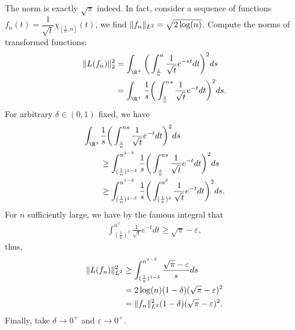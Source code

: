 \begin{enumerate}
\begin{proofc}[Remark]
The norm is exactly $\sqrt{\pi}$ indeed. 
In fact, consider a sequence of functions 
$f_{n}(t)=\dfrac{1}{\sqrt{t}}\chi_{[\frac{1}{n},n]}(t)$, 
we find $\Vert f_{n} \Vert_{L^2}=\sqrt{2 \log(n)}$. 
Compute the norms of transformed functions:
\begin{equation*}\begin{aligned}
\norm{L(f_{n})}_{2}^{2}
&=\int_{\R^{+}}\bigg(\int_{\frac{1}{n}}^{n}\frac{1}{\sqrt{t}}e^{-st}dt\bigg)^{2}ds\\
&=\int_{\R^{+}}\frac{1}{s}\bigg(\int_{\frac{s}{n}}^{ns}\frac{1}{\sqrt{t}}e^{-t}dt\bigg)^{2}ds.
\nonumber\end{aligned}\end{equation*}
For arbitrary $\delta \in (0,1)$ fixed, we have
\begin{equation*}\begin{aligned}
\int_{\R^{+}}&\frac{1}{s}\bigg(\int_{\frac{s}{n}}^{ns}
\frac{1}{\sqrt{t}}e^{-t}dt\bigg)^{2}ds\\
&\geq \int_{(\frac{1}{n})^{1-\delta}}^{n^{1-\delta}}\frac{1}{s}
\bigg(\int_{\frac{s}{n}}^{ns}\frac{1}{\sqrt{t}}e^{-t}dt\bigg)^{2}ds\\
&\geq \int_{(\frac{1}{n})^{1-\delta}}^{n^{1-\delta}}\frac{1}{s}
\bigg(\int_{(\frac{1}{n})^{\delta}}^{n^{\delta}}\frac{1}{\sqrt{t}}e^{-t}dt\bigg)^{2}ds.
\nonumber\end{aligned}\end{equation*}
For $n$ sufficiently large, we have by the famous integral that
\begin{equation*}\begin{aligned}
\int_{(\frac{1}{n})^{\delta}}^{n^{\delta}}\frac{1}{\sqrt{t}}e^{-t}dt 
\geq \sqrt{\pi} - \varepsilon,
\nonumber\end{aligned}\end{equation*}
thus,
\begin{equation*}\begin{aligned}
\Vert L(f_n) \Vert_{L^2}^{2} &\geq \int_{(\frac{1}{n})^{1-\delta}}^{n^{1-\delta}}
\frac{\sqrt{\pi} - \varepsilon}{s}ds \\
&= 2 \log(n) (1-\delta)(\sqrt{\pi} - \varepsilon)^{2} \\
&=\Vert f_n \Vert_{L^2}^{2}(1-\delta)(\sqrt{\pi} - \varepsilon)^{2}. 
\end{aligned}\end{equation*}
Finally, take $\delta \to 0^{+}$ and $\varepsilon \to 0^{+}$.
\end{proofc}
\end{enumerate}